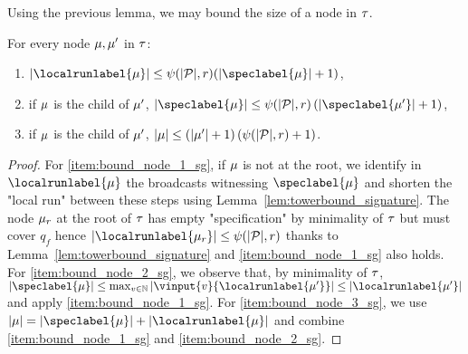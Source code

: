 


Using the previous lemma, we may bound the size of a node in $\tau$.

\begin{lemma}
\label{lem:bounds_tree_sg}
For every node $\mu, \mu'$ in $\tau$: \begin{enumerate}
\item \label{item:bound_node_1_sg} $\size{\localrunlabel{\node}} \leq \towerfun(\size{\prot}, r) (\size{\speclabel{\node}}+1)$,
\item \label{item:bound_node_2_sg} if $\mu$ is the child of $\mu'$, $\size{\speclabel{\node}} \leq \towerfun(\size{\prot}, r) \, (\size{\speclabel{\node'}}+1)$,
\item \label{item:bound_node_3_sg} if $\mu$ is the child of $\mu'$, $|\mu| \leq (|\mu'|+1) \, (\psi(|\mathcal{P}|,r)+1)$.
\end{enumerate} 
\end{lemma}
\begin{proof}
For \ref{item:bound_node_1_sg}, if $\mu$ is not at the root, we identify in $\localrunlabel{\node}$ the broadcasts witnessing $\speclabel{\node}$ and shorten the "local run" between these steps using Lemma~\ref{lem:towerbound_signature}. The node $\mu_r$ at the root of $\tau$ has empty "specification" by minimality of $\tau$ but must cover $q_f$ hence $\size{\localrunlabel{\node_r}} \leq \towerfun(\size{\prot},r)$ thanks to Lemma~\ref{lem:towerbound_signature} and \ref{item:bound_node_1_sg} also holds.
For \ref{item:bound_node_2_sg}, we observe that, by minimality of $\tau$, $\size{\speclabel{\node}} \leq \max_{v \in \nats} \size{\vinput{v}{\localrunlabel{\node'}}} \leq \size{\localrunlabel{\node'}}$ and apply \ref{item:bound_node_1_sg}. For \ref{item:bound_node_3_sg}, we use $\size{\node} = \size{\speclabel{\node}} + \size{\localrunlabel{\node}}$ and combine \ref{item:bound_node_1_sg} and \ref{item:bound_node_2_sg}.  
\end{proof}


